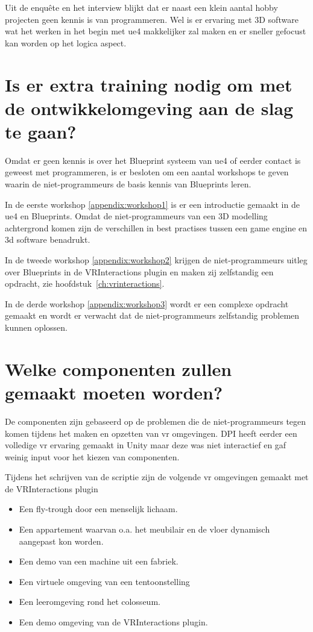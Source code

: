 Uit de enquête en het interview blijkt dat er naast een klein aantal hobby projecten geen kennis is van programmeren. Wel is er ervaring met 3D software wat het werken in het begin met \gls{ue4} makkelijker zal maken en er sneller gefocust kan worden op het logica aspect.

\section{Is er extra training nodig om met de ontwikkelomgeving aan de slag te gaan?}
Omdat er geen kennis is over het Blueprint systeem van \gls{ue4} of eerder contact is geweest met programmeren, is er besloten om een aantal workshops te geven waarin de niet-programmeurs de basis kennis van Blueprints leren.

In de eerste workshop \ref{appendix:workshop1} is er een introductie gemaakt in de \gls{ue4} en Blueprints. Omdat de niet-programmeurs van een 3D modelling achtergrond komen zijn de verschillen in best practises tussen een game engine en 3d software benadrukt.

In de tweede workshop \ref{appendix:workshop2} krijgen de niet-programmeurs uitleg over Blueprints in de VRInteractions plugin en maken zij zelfstandig een opdracht, zie hoofdstuk~\ref{ch:vrinteractions}. 

In de derde workshop \ref{appendix:workshop3} wordt er een complexe opdracht gemaakt en wordt er verwacht dat de niet-programmeurs zelfstandig problemen kunnen oplossen.

\section{Welke componenten zullen gemaakt moeten worden?}
De componenten zijn gebaseerd op de problemen die de niet-programmeurs tegen komen tijdens het maken en opzetten van \gls{vr} omgevingen. DPI heeft eerder een volledige \gls{vr} ervaring gemaakt in Unity maar deze was niet interactief en gaf weinig input voor het kiezen van componenten. 

Tijdens het schrijven van de scriptie zijn de volgende \gls{vr} omgevingen gemaakt met de VRInteractions plugin

\begin{itemize}
	\item Een fly-trough door een menselijk lichaam.
	\item Een appartement waarvan o.a. het meubilair en de vloer dynamisch aangepast kon worden.
	\item Een demo van een machine uit een fabriek.
	\item Een virtuele omgeving van een tentoonstelling
	\item Een leeromgeving rond het colosseum.
	\item Een demo omgeving van de VRInteractions plugin.
\end{itemize}

